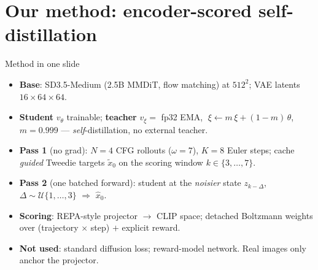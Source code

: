 \documentclass[aspectratio=169,10pt]{beamer}
\newcommand{\xhat}{\hat{x}_0}
\newcommand{\xtil}{\tilde{x}_0}
\begin{document}
\section{Our method: encoder-scored self-distillation}

\begin{frame}{Method in one slide}
  \begin{itemize}
    \item \textbf{Base}: SD3.5-Medium (2.5B MMDiT, flow matching) at $512^2$;
      VAE latents $16 \times 64 \times 64$.
    \item \textbf{Student} $v_\theta$ trainable; \textbf{teacher}
      $v_\xi = $ fp32 EMA, $\;\xi \leftarrow m\,\xi + (1{-}m)\,\theta$,
      $m = 0.999$ --- \emph{self}-distillation, no external teacher.
    \item \textbf{Pass 1} (no grad): $N{=}4$ CFG rollouts ($\omega{=}7$),
      $K{=}8$ Euler steps; cache \emph{guided} Tweedie targets $\xtil$ on the
      scoring window $k \in \{3, \dots, 7\}$.
    \item \textbf{Pass 2} (one batched forward): student at the \emph{noisier}
      state $z_{k-\Delta}$, $\Delta \sim \mathcal{U}\{1, \dots, 3\}$
      $\Rightarrow$ $\xhat$.
    \item \textbf{Scoring}: REPA-style projector $\to$ CLIP space; detached
      Boltzmann weights over (trajectory $\times$ step) $+$ explicit reward.
    \item \textbf{Not used}: standard diffusion loss; reward-model network.
      Real images only anchor the projector.
  \end{itemize}
\end{frame}
\end{document}
